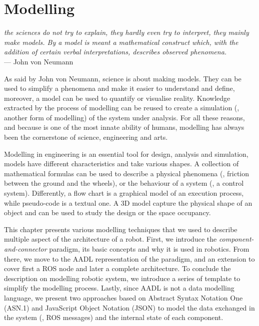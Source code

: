 \chapter[Modelling]{Modelling}\label{ch:Modelling}

\begin{flushright}{\slshape the sciences do not try to explain, they hardly even try to interpret, they mainly make models. By a model is meant a mathematical construct which, with the addition of certain verbal interpretations, describes observed phenomena.} \\ \medskip
    --- John  von Neumann
\end{flushright}

As said by John von Neumann, science is about making models. They can be used to simplify a phenomena and make it easier to understand and define, moreover, a model can be used to quantify or visualise reality. Knowledge extracted by the process of modelling can be reused to create a simulation (\ie, another form of modelling) of the system under analysis. For all these reasons, and because is one of the most innate ability of humans, modelling has always been the cornerstone of science, engineering and arts.

Modelling in engineering is an essential tool for design, analysis and simulation, models have different characteristics and take various shapes. A collection of mathematical formulas can be used to describe a physical phenomena (\eg, friction between the ground and the wheels), or the behaviour of a system (\eg, a control system). Differently, a flow chart is a graphical model of an execution process, while pseudo-code is a textual one. A 3D model capture the physical shape of an object and can be used to study the design or the space occupancy.

This chapter presents various modelling techniques that we used to describe multiple aspect of the architecture of a robot. First, we introduce the \textit{component-and-connector} paradigm, its basic concepts and why it is used in robotics. From there, we move to the AADL representation of the paradigm, and an extension to cover first a ROS node and later a complete architecture. To conclude the description on modelling robotic system, we introduce a series of template to simplify the modelling process. Lastly, since AADL is not a data modelling language, we present two approaches based on Abstract Syntax Notation One (ASN.1) and JavaScript Object Notation (JSON) to model the data exchanged in the system (\ie, ROS messages) and the internal state of each component.

